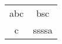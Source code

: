 \documentclass[11pt]{isuthesis}
\begin{document}
%
\begin{table}
    \begin{tabular}{c|c}
        abc&bsc\\ 
        c&ssssa
    \end{tabular}
\end{table}

% 
% 
\end{document}
